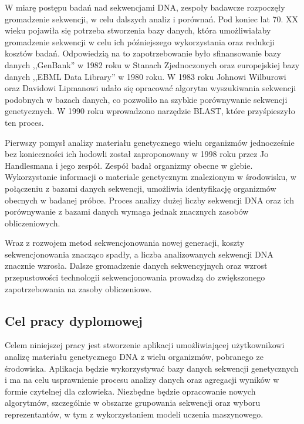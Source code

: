     W miarę postępu badań nad sekwencjami DNA, zespoły badawcze rozpoczęły gromadzenie sekwencji, w celu dalszych analiz i porównań. Pod koniec lat 70. XX wieku pojawiła się potrzeba stworzenia bazy danych, która umożliwiałaby gromadzenie sekwencji w celu ich późniejszego wykorzystania oraz redukcji kosztów badań. Odpowiedzią na to zapotrzebowanie było sfinansowanie bazy danych ,,GenBank'' w 1982 roku w Stanach Zjednoczonych\cite{Bilofsky:1986} oraz europejskiej bazy danych ,,EBML Data Library'' w 1980 roku\cite{Higgins:1992}. W 1983 roku Johnowi Wilburowi oraz Davidowi Lipmanowi udało się opracować algorytm wyszukiwania sekwencji podobnych w bazach danych\cite{Wilbur:1983}, co pozwoliło na szybkie porównywanie sekwencji genetycznych. W 1990 roku wprowadzono narzędzie BLAST\cite{Altschul:1990}, które przyśpieszyło ten proces.

    Pierwszy pomysł analizy materiału genetycznego wielu organizmów jednocześnie bez konieczności ich hodowli został zaproponowany w 1998 roku przez Jo Handlesmana i jego zespół\cite{Handelsman:1998}. Zespół badał organizmy obecne w glebie. Wykorzystanie informacji o materiale genetycznym znalezionym w środowisku, w połączeniu z bazami danych sekwencji, umożliwia  identyfikację organizmów obecnych w badanej próbce. Proces analizy dużej liczby sekwencji DNA oraz ich porównywanie z bazami danych wymaga jednak znacznych zasobów obliczeniowych.

    Wraz z rozwojem metod sekwencjonowania nowej generacji\cite{Reinartz:2002}, koszty sekwencjonowania znacząco spadły, a liczba analizowanych sekwencji DNA znacznie wzrosła\cite{Muir:2016}. Dalsze gromadzenie danych sekwencyjnych oraz wzrost przepustowości technologii sekwencjonowania prowadzą do zwiększonego zapotrzebowania na zasoby obliczeniowe.

    \subsection{Cel pracy dyplomowej}

        Celem niniejszej pracy jest stworzenie aplikacji umożliwiającej użytkownikowi analizę materiału genetycznego DNA z wielu organizmów, pobranego ze środowiska. Aplikacja będzie wykorzystywać bazy danych sekwencji genetycznych i ma na celu usprawnienie procesu analizy danych oraz agregacji wyników w formie czytelnej dla człowieka. Niezbędne będzie opracowanie nowych algorytmów, szczególnie w obszarze grupowania sekwencji oraz wyboru reprezentantów, w tym z wykorzystaniem modeli uczenia maszynowego.

